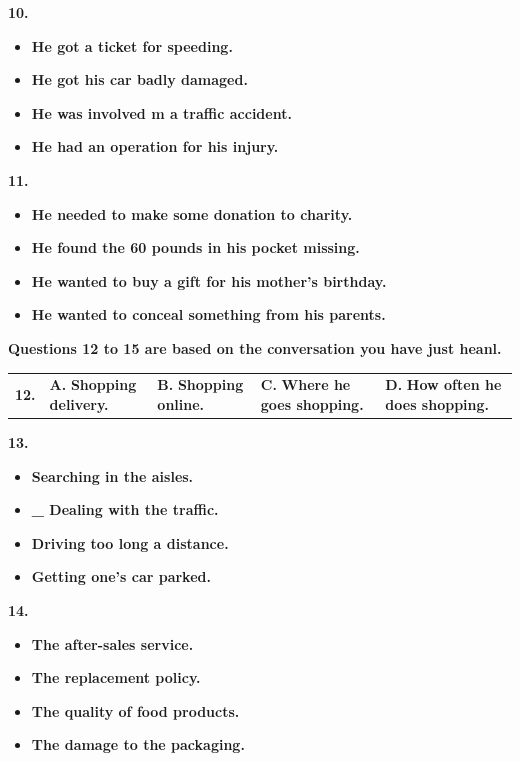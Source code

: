 \documentclass[UTF8,11pt]{ctexart}
\begin{document}
\textbf{10.}


\begin{itemize}[leftmargin=2em,itemsep=.2em,topsep=.4em]\item[A.] \textbf{He got a ticket for speeding.}
\item[B.] \textbf{He got his car badly damaged.}
\item[C.] \textbf{He was involved m a traffic accident.}
\item[D.] \textbf{He had an operation for his injury.}
\end{itemize}

\textbf{11.}


\begin{itemize}[leftmargin=2em,itemsep=.2em,topsep=.4em]\item[A.] \textbf{He needed to make some donation to charity.}
\item[B.] \textbf{He found the 60 pounds in his pocket missing.}
\item[C.] \textbf{He wanted to buy a gift for his mother's birthday.}
\item[D.] \textbf{He wanted to conceal something from his parents.}
\end{itemize}

\textbf{Questions 12 to 15 are based on the conversation you have just heanl.}


\noindent\begin{tabularx}{\linewidth}{@{}lXXXX@{}}\textbf{12.} & \textbf{A.} \textbf{Shopping delivery.} & \textbf{B.} \textbf{Shopping online.} & \textbf{C.} \textbf{Where he goes shopping.} & \textbf{D.} \textbf{How often he does shopping.}\\\end{tabularx}\par

\textbf{13.}


\begin{itemize}[leftmargin=2em,itemsep=.2em,topsep=.4em]\item[A.] \textbf{Searching in the aisles.}
\item[B.] \textbf{\_ Dealing with the traffic.}
\item[C.] \textbf{Driving too long a distance.}
\item[D.] \textbf{Getting one's car parked.}
\end{itemize}

\textbf{14.}


\begin{itemize}[leftmargin=2em,itemsep=.2em,topsep=.4em]\item[A.] \textbf{The after-sales service.}
\item[B.] \textbf{The replacement policy.}
\item[C.] \textbf{The quality of food products.}
\item[D.] \textbf{The damage to the packaging.}
\end{itemize}
\end{document}
